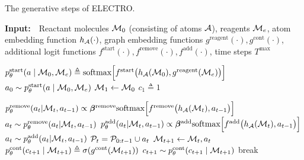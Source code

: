\begin{algorithm}[t]
  \caption{The generative steps of ELECTRO.}
  {\bf Input:}~~Reactant molecules ${\mathcal{M}}_0$ (consisting of atoms ${\mathcal{A}}$), reagents ${\mathcal{M}}_e$, atom embedding function $h_{{\mathcal{A}}}(\cdot)$, graph embedding functions $g^\mathrm{reagent}(\cdot),g^\mathrm{cont}(\cdot)$, additional logit functions $f^\mathrm{start}(\cdot),f^\mathrm{remove}(\cdot),f^\mathrm{add}(\cdot)$, time steps $T^\mathrm{max}$
  
  \begin{algorithmic}[1]
  	\STATE $p_\theta^{\mathrm{start}}(a \mid {\mathcal{M}}_0, {\mathcal{M}}_e) \triangleq \mbox{softmax}\Big[f^{\mathrm{start}}\big(h_{{\mathcal{A}}}({\mathcal{M}}_0), g^\mathrm{reagent}({\mathcal{M}}_e)\big)\Big]$ 
  	\STATE $a_{0} \sim p_\theta^{\mathrm{start}}(a \mid {\mathcal{M}}_0, {\mathcal{M}}_e)$
  	\STATE ${\mathcal{M}}_{1} \leftarrow {\mathcal{M}}_{0}$ 
  	  \STATE $c_1 \triangleq 1 $ 

  			\STATE $p_\theta^{\mathrm{remove}}(a_t | {\mathcal{M}}_t, a_{t-1}) \propto \bm{\beta}^\textrm{remove} \mbox{softmax}\Big[f^{\mathrm{remove}}\big(h_{{\mathcal{A}}}({\mathcal{M}}_t), a_{t-1}\big)\Big]$ 
  			\STATE $a_t \sim p_\theta^{\mathrm{remove}}(a_t | {\mathcal{M}}_t, a_{t-1})$ 
  		\ELSE
  		  	\STATE $p_\theta^{\mathrm{add}}(a_t | {\mathcal{M}}_t, a_{t-1}) \propto \bm{\beta}^\textrm{add} \mbox{softmax}\Big[f^{\mathrm{add}}\big(h_{{\mathcal{A}}}({\mathcal{M}}_t), a_{t-1}\big)\Big]$
  			\STATE  $a_t \sim p_\theta^{\mathrm{add}}(a_t | {\mathcal{M}}_t, a_{t-1})$ 
  		\ENDIF
  		\STATE ${\mathcal{P}}_t = {\mathcal{P}}_{0:t-1} \cup a_t$
  		\STATE ${\mathcal{M}}_{t+1} \leftarrow {\mathcal{M}}_{t}, a_{t}$ 
  		\STATE $p_\theta^{\textrm{cont}}(c_{t+1} \mid {\mathcal{M}}_{t+1}) \triangleq \sigma(g^{\textrm{cont}}( {\mathcal{M}}_{t+1}))$
  		\STATE $c_{t+1} \sim p_\theta^{\textrm{cont}}(c_{t+1} \mid {\mathcal{M}}_{t+1})$ 
  			\STATE break
  		\ENDIF
  	\ENDFOR
  	

\end{algorithmic}
\end{algorithm}
